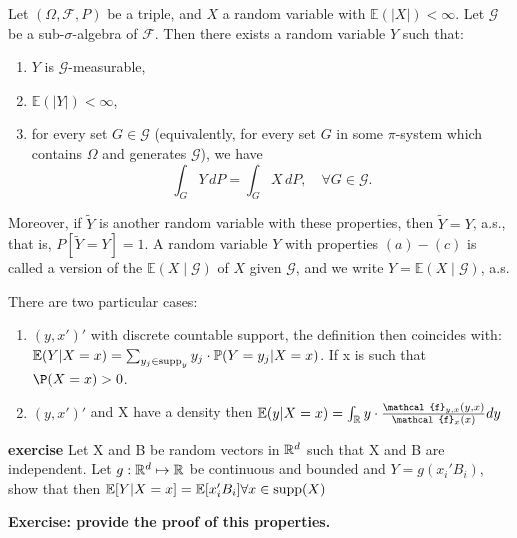 \documentclass{article}
\begin{document}
\begin{definition}
    Let \((\Omega, \mathcal{F}, P)\) be a triple, and \(X\) a random variable with \(\mathbb{E}(|X|) < \infty\). Let \(\mathcal{G}\) be a sub-\(\sigma\)-algebra of \(\mathcal{F}\). Then there exists a random variable \(Y\) such that:
    \begin{enumerate}
        \item \(Y\) is \(\mathcal{G}\)-measurable,
        \item \(\mathbb{E}(|Y|) < \infty\),
        \item for every set \(G \in \mathcal{G}\) (equivalently, for every set \(G\) in some \(\pi\)-system which contains \(\Omega\) and generates \(\mathcal{G}\)), we have
        \[
        \int_G Y \, dP = \int_G X \, dP, \quad \forall G \in \mathcal{G}.
        \]
    \end{enumerate}
    Moreover, if \(\tilde{Y}\) is another random variable with these properties, then \(\tilde{Y} = Y\), a.s., that is, \(P[\tilde{Y} = Y] = 1\). A random variable \(Y\) with properties \((a)-(c)\) is called a version of the  \(\mathbb{E}(X \mid \mathcal{G})\) of \(X\) given \(\mathcal{G}\), and we write \(Y = \mathbb{E}(X \mid \mathcal{G})\), a.s.
    \end{definition}
    

\begin{remark}
    There are two particular cases: \begin{enumerate}
        \item \((y,x')'\) with discrete countable support, the definition then coincides with: \(\mathbb{E}(Y|X=x)=\sum_{y_{j}\in \text{supp}_{y}}y_{j}\cdot \mathbb{P}(Y=y_{j}|X=x)\). If x is such that \(\P(X=x)>0\).
        \item \((y,x')'\) and X have a density then \( \E(y|X=x)=\int_{\R}y \cdot \frac{\mathcal{f}_{y,x}(y,x)}{\mathcal{f}_{x}(x)}dy\)
    \end{enumerate}
\end{remark}

\textbf{exercise} Let X and B be random vectors in $\mathbb{R}^{d}$ such that X and B are independent. Let \(g: \mathbb{R}^{d} \mapsto \mathbb{R}\) be continuous and bounded and \(Y=g(x_{i}'B_{i})\), show that then \(\mathbb{E}[Y|X=x]=\mathbb{E}[x_{i}'B_{i}] \forall x \in
\text{supp}(X)\)

\textbf{Exercise: provide the proof of this properties.}
\end{document}
